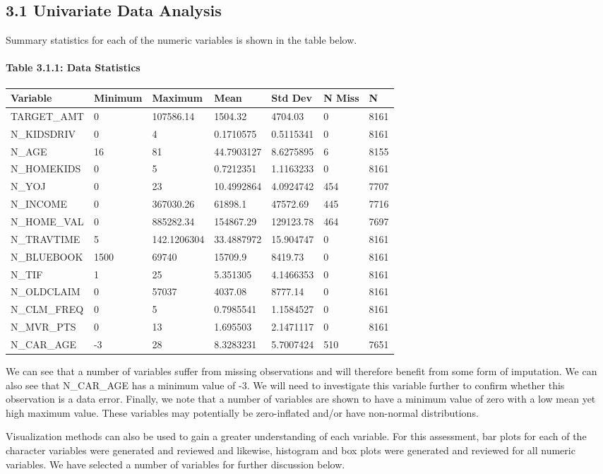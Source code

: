 \documentclass[]{article}
\let\oldparagraph\paragraph
\renewcommand{\paragraph}[1]{\oldparagraph{#1}\mbox{}}
\begin{document}
\subsection{3.1 Univariate Data
Analysis}\label{univariate-data-analysis}

Summary statistics for each of the numeric variables is shown in the
table below.

\paragraph{Table 3.1.1: Data
Statistics}\label{table-3.1.1-data-statistics}

\begin{longtable}[]{@{}lllllll@{}}
\toprule
Variable & Minimum & Maximum & Mean & Std Dev & N Miss &
N\tabularnewline
\midrule
\endhead
TARGET\_AMT & 0 & 107586.14 & 1504.32 & 4704.03 & 0 &
8161\tabularnewline
N\_KIDSDRIV & 0 & 4 & 0.1710575 & 0.5115341 & 0 & 8161\tabularnewline
N\_AGE & 16 & 81 & 44.7903127 & 8.6275895 & 6 & 8155\tabularnewline
N\_HOMEKIDS & 0 & 5 & 0.7212351 & 1.1163233 & 0 & 8161\tabularnewline
N\_YOJ & 0 & 23 & 10.4992864 & 4.0924742 & 454 & 7707\tabularnewline
N\_INCOME & 0 & 367030.26 & 61898.1 & 47572.69 & 445 &
7716\tabularnewline
N\_HOME\_VAL & 0 & 885282.34 & 154867.29 & 129123.78 & 464 &
7697\tabularnewline
N\_TRAVTIME & 5 & 142.1206304 & 33.4887972 & 15.904747 & 0 &
8161\tabularnewline
N\_BLUEBOOK & 1500 & 69740 & 15709.9 & 8419.73 & 0 & 8161\tabularnewline
N\_TIF & 1 & 25 & 5.351305 & 4.1466353 & 0 & 8161\tabularnewline
N\_OLDCLAIM & 0 & 57037 & 4037.08 & 8777.14 & 0 & 8161\tabularnewline
N\_CLM\_FREQ & 0 & 5 & 0.7985541 & 1.1584527 & 0 & 8161\tabularnewline
N\_MVR\_PTS & 0 & 13 & 1.695503 & 2.1471117 & 0 & 8161\tabularnewline
N\_CAR\_AGE & -3 & 28 & 8.3283231 & 5.7007424 & 510 &
7651\tabularnewline
\bottomrule
\end{longtable}

We can see that a number of variables suffer from missing observations
and will therefore benefit from some form of imputation. We can also see
that N\_CAR\_AGE has a minimum value of -3. We will need to investigate
this variable further to confirm whether this observation is a data
error. Finally, we note that a number of variables are shown to have a
minimum value of zero with a low mean yet high maximum value. These
variables may potentially be zero-inflated and/or have non-normal
distributions.

Visualization methods can also be used to gain a greater understanding
of each variable. For this assessment, bar plots for each of the
character variables were generated and reviewed and likewise, histogram
and box plots were generated and reviewed for all numeric variables. We
have selected a number of variables for further discussion below.
\end{document}
